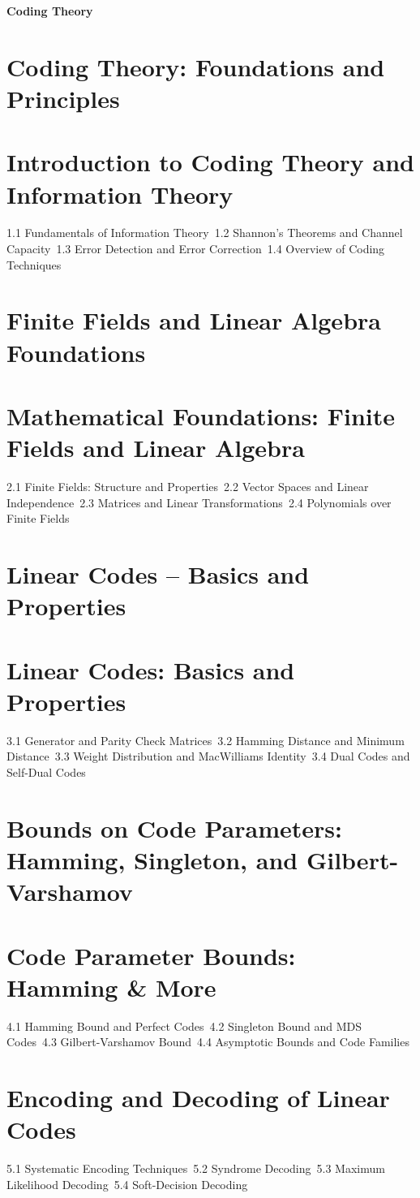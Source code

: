 {\LARGE \bf{Coding Theory}}
\section{Coding Theory: Foundations and Principles}
\section{Introduction to Coding Theory and Information Theory}
1.1 Fundamentals of Information Theory\
1.2 Shannon's Theorems and Channel Capacity\
1.3 Error Detection and Error Correction\
1.4 Overview of Coding Techniques\
\section{Finite Fields and Linear Algebra Foundations}
\section{Mathematical Foundations: Finite Fields and Linear Algebra}
2.1 Finite Fields: Structure and Properties\
2.2 Vector Spaces and Linear Independence\
2.3 Matrices and Linear Transformations\
2.4 Polynomials over Finite Fields\
\section{Linear Codes – Basics and Properties}
\section{Linear Codes: Basics and Properties}
3.1 Generator and Parity Check Matrices\
3.2 Hamming Distance and Minimum Distance\
3.3 Weight Distribution and MacWilliams Identity\
3.4 Dual Codes and Self-Dual Codes\
\section{Bounds on Code Parameters: Hamming, Singleton, and Gilbert-Varshamov}
\section{Code Parameter Bounds: Hamming \& More}
4.1 Hamming Bound and Perfect Codes\
4.2 Singleton Bound and MDS Codes\
4.3 Gilbert-Varshamov Bound\
4.4 Asymptotic Bounds and Code Families\
\section{Encoding and Decoding of Linear Codes}
5.1 Systematic Encoding Techniques\
5.2 Syndrome Decoding\
5.3 Maximum Likelihood Decoding\
5.4 Soft-Decision Decoding\
